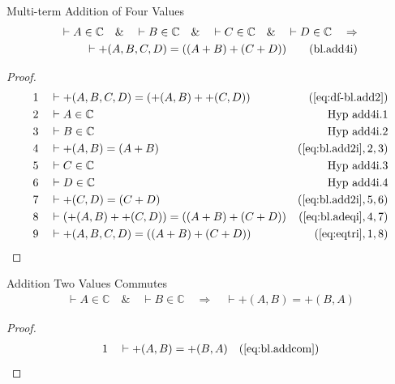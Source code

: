 \begin{lemma} {Multi-term Addition of Four Values}
\begin{align}
\vdash A \in \mathbb{C}\quad\&\quad \vdash B \in \mathbb{C}\quad\&\quad \vdash
    C \in \mathbb{C}\quad\&\quad \vdash D \in \mathbb{C}\quad\Rightarrow \notag\\
    \vdash +( A , B , C , D ) = ( ( A + B ) + ( C + D )
    )\label{eq:bl.add4i}\tag{bl.add4i}
\end{align}
\end{lemma}


\begin{proof}
\begin{align}
  1 &&  & \vdash +( A , B , C , D ) = ( +( A , B ) + +( C , D )
     )&(\mbox{\ref{eq:df-bl.add2}})\notag
  \\ 2 &&  & \vdash A \in \mathbb{C}&\text{Hyp~add4i.1}\notag%
  \\ 3 &&  & \vdash B \in \mathbb{C}&\text{Hyp~add4i.2}\notag%
  \\ 4 &&  & \vdash +( A , B ) = ( A + B )&(\mbox{\ref{eq:bl.add2i}},2,3)\notag
  \\ 5 &&  & \vdash C \in \mathbb{C}&\text{Hyp~add4i.3}\notag%
  \\ 6 &&  & \vdash D \in \mathbb{C}&\text{Hyp~add4i.4}\notag%
  \\ 7 &&  & \vdash +( C , D ) = ( C + D )&(\mbox{\ref{eq:bl.add2i}},5,6)\notag
  \\ 8 &&  & \vdash ( +( A , B ) + +( C , D ) ) = ( ( A + B ) + ( C + D )
     )&(\mbox{\ref{eq:bl.adeqi}},4,7)\notag
  \\ 9 &&  & \vdash +( A , B , C , D ) = ( ( A + B ) + ( C + D )
     )&(\mbox{\ref{eq:eqtri}},1,8)\notag
\end{align}
\end{proof}

\begin{lemma} {Addition Two Values Commutes}
\begin{align}
\vdash A \in \mathbb{C}\quad\&\quad \vdash B \in
    \mathbb{C}\quad\Rightarrow\quad \vdash +( A , B ) = +( B , A
    )\label{eq:bl.addcom2}\tag{bl.addcom2}
\end{align}
\end{lemma}


\begin{proof}
\begin{align}
  1 &&  & \vdash +( A , B ) = +( B , A )&(\mbox{\ref{eq:bl.addcom}})\notag
\end{align}
\end{proof}

